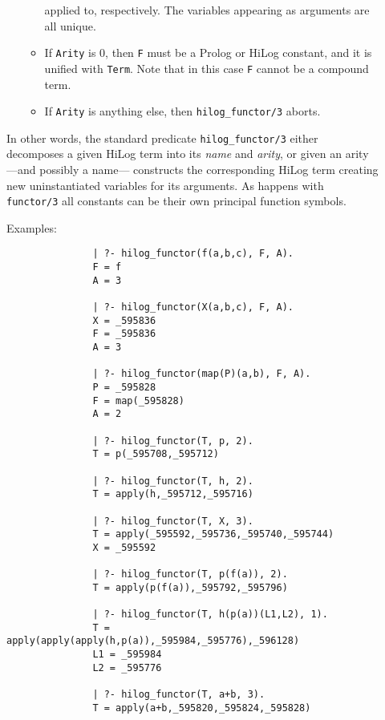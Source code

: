 \begin{description}
\begin{enumerate}
\begin{itemize}
                applied to, respectively. The variables appearing as 
                arguments are all unique.
          \item If {\tt Arity} is 0, then {\tt F} must be a Prolog or
                HiLog constant, and it is unified with {\tt Term}\@. Note
                that in this case {\tt F} cannot be a compound term.
          \item If {\tt Arity} is anything else, then {\tt hilog\_functor/3}
                aborts.
          \end{itemize}
    \end{enumerate}
    In other words, the standard predicate {\tt hilog\_functor/3} either
    decomposes a given HiLog term into its {\em name} and {\em arity}, or
    given an arity ---and possibly a name--- constructs the corresponding 
    HiLog term creating new uninstantiated variables for its arguments. 
    As happens with {\tt functor/3} all constants can be their own 
    principal function symbols.

    Examples:
    {\footnotesize
     \begin{verbatim}
               | ?- hilog_functor(f(a,b,c), F, A).
               F = f
               A = 3

               | ?- hilog_functor(X(a,b,c), F, A).
               X = _595836
               F = _595836
               A = 3

               | ?- hilog_functor(map(P)(a,b), F, A).
               P = _595828
               F = map(_595828)
               A = 2

               | ?- hilog_functor(T, p, 2).
               T = p(_595708,_595712)

               | ?- hilog_functor(T, h, 2).
               T = apply(h,_595712,_595716)

               | ?- hilog_functor(T, X, 3).
               T = apply(_595592,_595736,_595740,_595744)
               X = _595592

               | ?- hilog_functor(T, p(f(a)), 2).
               T = apply(p(f(a)),_595792,_595796)

               | ?- hilog_functor(T, h(p(a))(L1,L2), 1).
               T = apply(apply(apply(h,p(a)),_595984,_595776),_596128)
               L1 = _595984
               L2 = _595776

               | ?- hilog_functor(T, a+b, 3).
               T = apply(a+b,_595820,_595824,_595828)
     \end{verbatim}}


\end{description}
